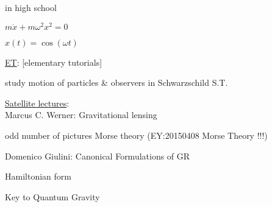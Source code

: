 in high school 

$m\ddot{x} + m\omega^2 x^2=0$

$x(t) = \cos{(\omega t)}$

\underline{ET}: [elementary tutorials]

study motion of particles \& observers in Schwarzschild S.T.

\underline{Satellite lectures}: \\
Marcus C. Werner: Gravitational lensing

odd number of pictures Morse theory (EY:20150408 Morse Theory !!!)

Domenico Giulini: Canonical Formulations of GR

Hamiltonian form

Key to Quantum Gravity
